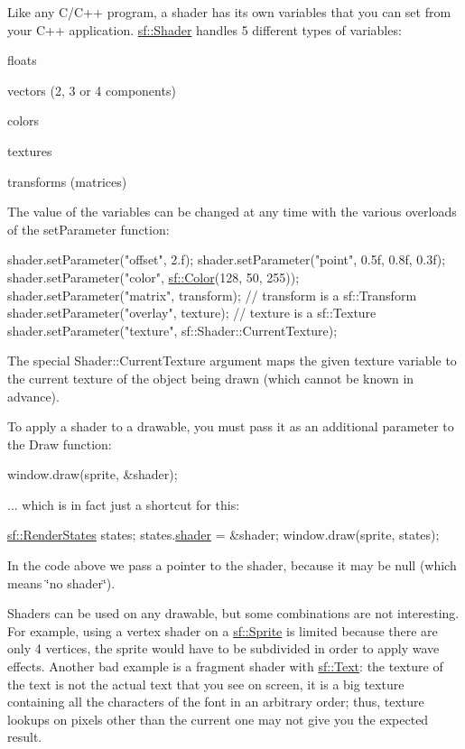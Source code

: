 Like any C/\-C++ program, a shader has its own variables that you can set from your C++ application. \hyperlink{classsf_1_1Shader}{sf\-::\-Shader} handles 5 different types of variables\-: \begin{DoxyItemize}
\item floats \item vectors (2, 3 or 4 components) \item colors \item textures \item transforms (matrices)\end{DoxyItemize}
The value of the variables can be changed at any time with the various overloads of the set\-Parameter function\-: 
\begin{DoxyCode}
shader.setParameter(\textcolor{stringliteral}{"offset"}, 2.f);
shader.setParameter(\textcolor{stringliteral}{"point"}, 0.5f, 0.8f, 0.3f);
shader.setParameter(\textcolor{stringliteral}{"color"}, \hyperlink{classsf_1_1Color}{sf::Color}(128, 50, 255));
shader.setParameter(\textcolor{stringliteral}{"matrix"}, transform); \textcolor{comment}{// transform is a sf::Transform}
shader.setParameter(\textcolor{stringliteral}{"overlay"}, texture); \textcolor{comment}{// texture is a sf::Texture}
shader.setParameter(\textcolor{stringliteral}{"texture"}, sf::Shader::CurrentTexture);
\end{DoxyCode}


The special Shader\-::\-Current\-Texture argument maps the given texture variable to the current texture of the object being drawn (which cannot be known in advance).

To apply a shader to a drawable, you must pass it as an additional parameter to the Draw function\-: 
\begin{DoxyCode}
window.draw(sprite, &shader);
\end{DoxyCode}


... which is in fact just a shortcut for this\-: 
\begin{DoxyCode}
\hyperlink{classsf_1_1RenderStates}{sf::RenderStates} states;
states.\hyperlink{classsf_1_1RenderStates_ad4f79ecdd0c60ed0d24fbe555b221bd8}{shader} = &shader;
window.draw(sprite, states);
\end{DoxyCode}


In the code above we pass a pointer to the shader, because it may be null (which means \char`\"{}no shader\char`\"{}).

Shaders can be used on any drawable, but some combinations are not interesting. For example, using a vertex shader on a \hyperlink{classsf_1_1Sprite}{sf\-::\-Sprite} is limited because there are only 4 vertices, the sprite would have to be subdivided in order to apply wave effects. Another bad example is a fragment shader with \hyperlink{classsf_1_1Text}{sf\-::\-Text}\-: the texture of the text is not the actual text that you see on screen, it is a big texture containing all the characters of the font in an arbitrary order; thus, texture lookups on pixels other than the current one may not give you the expected result.


